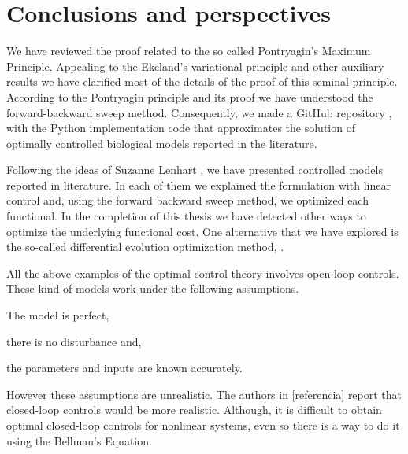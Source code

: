 \chapter{Conclusions and perspectives}
    We have reviewed the proof related to the so called Pontryagin's Maximum 
    Principle. Appealing to the Ekeland's variational principle and other 
    auxiliary results we have clarified most of the details of the proof of this 
    seminal principle. According to the Pontryagin principle and its proof we have 
    understood the forward-backward sweep method. Consequently, we made a GitHub 
    repository \citep{python_Thesisrepo}, with the Python implementation code 
    that approximates the solution of optimally controlled biological models 
    reported in the literature. 

    Following the ideas of Suzanne Lenhart \citep{lenhart2007optimal}, we have 
    presented controlled models reported in literature. In each of them we 
    explained the formulation with linear control and, using the forward backward 
    sweep method, we optimized each functional. In the completion of this thesis 
    we have detected other ways to optimize the underlying functional cost. One 
    alternative that we have explored is the so-called differential evolution 
    optimization method, \citep{python_Thesisrepo}.

    All the above examples of the optimal control theory involves open-loop
    controls. These kind of models work under the following assumptions. 
    \begin{inparaenum} [i)]
        \item The model is perfect,
        \item there is no disturbance and,
        \item the parameters and inputs are known accurately.
    \end{inparaenum}
    However these assumptions are unrealistic. The authors in [referencia] report that 
    closed-loop controls would be more realistic. Although, it is difficult to 
    obtain optimal closed-loop controls for nonlinear systems, even so there 
    is a way to do it using the Bellman's Equation.

